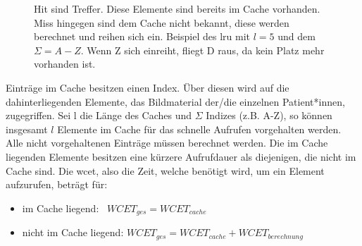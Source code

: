 \begin{figure}[b]\centering
{}
\caption[Beispiel des \ac{lru}]{Hit sind Treffer. Diese Elemente sind bereits im Cache vorhanden. Miss hingegen sind dem Cache nicht bekannt, diese werden berechnet und reihen sich ein. Beispiel des \ac{lru} mit $l=5$ und dem $\Sigma=A-Z$. Wenn Z sich einreiht, fliegt D raus, da kein Platz mehr vorhanden ist.}\label{cap:lrucache}
\end{figure}\label{fig:lrucache}

Einträge im Cache besitzen einen Index. Über diesen wird auf die dahinterliegenden Elemente, das Bildmaterial der/die einzelnen Patient*innen, zugegriffen. Sei l die Länge des Caches und $\Sigma$ Indizes (z.B. A-Z), so können insgesamt $l$ Elemente im Cache für das schnelle Aufrufen vorgehalten werden. Alle nicht vorgehaltenen Einträge müssen berechnet werden. Die im Cache liegenden Elemente besitzen eine kürzere Aufrufdauer als diejenigen, die nicht im Cache sind. Die \ac{wcet}, also die Zeit, welche benötigt wird, um ein Element aufzurufen, beträgt für:

\begin{itemize}
  \setlength\itemsep{-0.5em}
\item im Cache liegend: \qquad\, $WCET_{ges}=WCET_{cache}$
\item nicht im Cache liegend: $WCET_{ges}=WCET_{cache} + WCET_{berechnung}$
\end{itemize}

